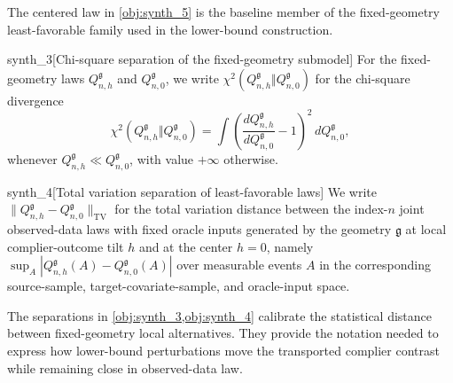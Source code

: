 The centered law in \cref{obj:synth_5} is the baseline member of the fixed-geometry least-favorable family used in the lower-bound construction.

\begin{definitionv}{synth_3}[Chi-square separation of the fixed-geometry submodel]
For the fixed-geometry laws \(Q_{n,h}^{\mathfrak g}\) and \(Q_{n,0}^{\mathfrak g}\), we write \(\chi^2(Q_{n,h}^{\mathfrak g}\Vert Q_{n,0}^{\mathfrak g})\) for the chi-square divergence \[\chi^2(Q_{n,h}^{\mathfrak g}\Vert Q_{n,0}^{\mathfrak g})=\int \left(\frac{dQ_{n,h}^{\mathfrak g}}{dQ_{n,0}^{\mathfrak g}}-1\right)^2\,dQ_{n,0}^{\mathfrak g},\] whenever \(Q_{n,h}^{\mathfrak g}\ll Q_{n,0}^{\mathfrak g}\), with value \(+\infty\) otherwise.
\end{definitionv}

\begin{definitionv}{synth_4}[Total variation separation of least-favorable laws]
We write \(\|Q_{n,h}^{\mathfrak g}-Q_{n,0}^{\mathfrak g}\|_{\mathrm{TV}}\) for the total variation distance between the index-\(n\) joint observed-data laws with fixed oracle inputs generated by the geometry \(\mathfrak g\) at local complier-outcome tilt \(h\) and at the center \(h=0\), namely \(\sup_A |Q_{n,h}^{\mathfrak g}(A)-Q_{n,0}^{\mathfrak g}(A)|\) over measurable events \(A\) in the corresponding source-sample, target-covariate-sample, and oracle-input space.
\end{definitionv}

The separations in \cref{obj:synth_3,obj:synth_4} calibrate the statistical distance between fixed-geometry local alternatives.  They provide the notation needed to express how lower-bound perturbations move the transported complier contrast while remaining close in observed-data law.
